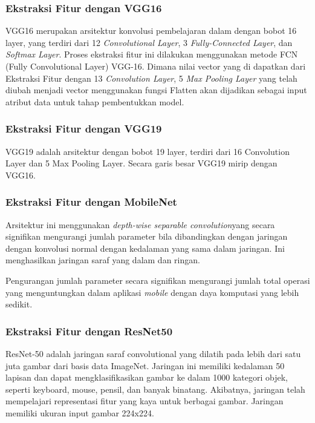 \subsubsection{Ekstraksi Fitur dengan VGG16}
\par VGG16 merupakan arsitektur konvolusi pembelajaran dalam dengan bobot 16 layer, yang terdiri dari 12 \textit{Convolutional Layer}, 3 \textit{Fully-Connected Layer}, dan \textit{Softmax Layer}. Proses ekstraksi fitur ini dilakukan menggunakan metode FCN (Fully Convolutional Layer) VGG-16. Dimana nilai vector yang di dapatkan dari Ekstraksi Fitur dengan 13 \textit{Convolution Layer}, 5 \textit{Max Pooling Layer} yang telah diubah menjadi vector menggunakan fungsi Flatten akan dijadikan sebagai input atribut data untuk tahap pembentukkan model.

\subsubsection{Ekstraksi Fitur dengan VGG19}
\par VGG19 adalah arsitektur dengan bobot 19 layer, terdiri dari 16 Convolution Layer dan 5 Max Pooling Layer. Secara garis besar VGG19 mirip dengan VGG16. 

\subsubsection{Ekstraksi Fitur dengan MobileNet}
\par Arsitektur ini menggunakan \textit{depth-wise separable convolution}yang secara signifikan mengurangi jumlah parameter bila dibandingkan dengan jaringan dengan konvolusi normal dengan kedalaman yang sama dalam jaringan. Ini menghasilkan jaringan saraf yang dalam dan ringan. 
\par Pengurangan jumlah parameter secara signifikan mengurangi jumlah total operasi yang menguntungkan dalam aplikasi \textit{mobile} dengan daya komputasi yang lebih sedikit.

\subsubsection{Ekstraksi Fitur dengan ResNet50}
\par ResNet-50 adalah jaringan saraf convolutional yang dilatih pada lebih dari satu juta gambar dari basis data ImageNet. Jaringan ini memiliki kedalaman 50 lapisan dan dapat mengklasifikasikan gambar ke dalam 1000 kategori objek, seperti keyboard, mouse, pensil, dan banyak binatang. Akibatnya, jaringan telah mempelajari representasi fitur yang kaya untuk berbagai gambar. Jaringan memiliki ukuran input gambar 224x224.

